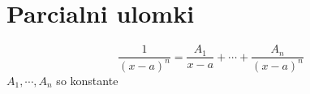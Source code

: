\documentclass[a4paper,12pt]{article}
\begin{document}
\tableofcontents

\section{Parcialni ulomki}
$$
\frac{1}{(x-a)^n} = \frac{A_1}{x-a} + \cdots + \frac{A_n}{(x-a)^n}
$$
$A_1, \cdots, A_n$ so konstante
\end{document}
